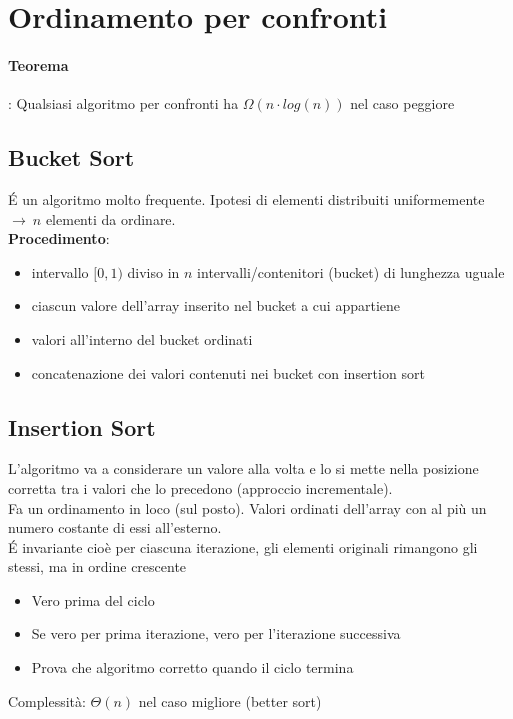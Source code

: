 \documentclass[12pt,a4paper]{article}
\begin{document}
\clearpage
\section{Ordinamento per confronti}
\paragraph{Teorema}: Qualsiasi algoritmo per confronti ha $\Omega(n\cdot log(n))$ nel caso peggiore

\subsection{Bucket Sort}
\'E un algoritmo molto frequente. Ipotesi di elementi distribuiti uniformemente $\rightarrow \ n$ elementi da ordinare.\\
\textbf{Procedimento}:
\begin{itemize}
\item intervallo $[0,1)$ diviso in $n$ intervalli/contenitori (bucket) di lunghezza uguale
\item ciascun valore dell'array inserito nel bucket a cui appartiene
\item valori all'interno del bucket ordinati
\item concatenazione dei valori contenuti nei bucket con insertion sort
\end{itemize} 

\subsection{Insertion Sort}
L'algoritmo va a considerare un valore alla volta e lo si mette nella posizione corretta tra i valori che lo precedono (approccio incrementale).\\
Fa un ordinamento in loco (sul posto). Valori ordinati dell'array con al più un numero costante di essi all'esterno.\\
\'E invariante cioè per ciascuna iterazione, gli elementi originali rimangono gli stessi, ma in ordine crescente\\
\begin{itemize}
\item Vero prima del ciclo
\item Se vero per prima iterazione, vero per l'iterazione successiva
\item Prova che algoritmo corretto quando il ciclo termina
\end{itemize}
Complessità: $\Theta(n)$ nel caso migliore (better sort)
\end{document}

